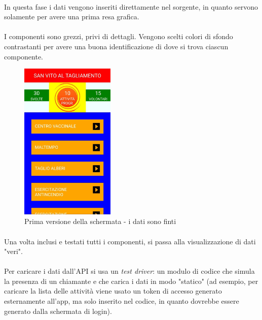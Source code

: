 \documentclass[12pt,a4paper,twoside,english,italian]{book}
\begin{document}
\paragraph{} In questa fase i dati vengono inseriti direttamente nel sorgente, in quanto servono solamente per avere una prima resa grafica. 

\paragraph{} I componenti sono grezzi, privi di dettagli. Vengono scelti colori di sfondo contrastanti per avere una buona identificazione di dove si trova ciascun componente. 

\begin{figure}[H]
    \centering
    \includegraphics[width=0.4\textwidth]{img/app_1.jpeg}
    \caption{Prima versione della schermata - i dati sono finti}
\end{figure}

\paragraph{} Una volta inclusi e testati tutti i componenti, si passa alla visualizzazione di dati "veri". 

\paragraph{} Per caricare i dati dall'API si usa un \emph{test driver}: un modulo di codice che simula la presenza di un chiamante e che carica i dati in modo "statico" (ad esempio, per caricare la lista delle attività viene usato un token di accesso generato esternamente all'app, ma solo inserito nel codice, in quanto dovrebbe essere generato dalla schermata di login). 
\end{document}
